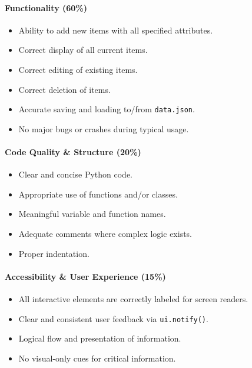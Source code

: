 \documentclass[
  justified,
  openright,
]{tufte-book}
\let\subsection\paragraph
\let\paragraph\paragraph
\let\subsection\paragraph
\let\paragraph\paragraph
\providecommand{\tightlist}{%
  \setlength{\itemsep}{0pt}\setlength{\parskip}{0pt}}
\begin{document}
\subsection{Functionality (60\%)}\label{functionality-60}

\begin{itemize}
\tightlist
\item[$\square$]
  Ability to add new items with all specified attributes.
\item[$\square$]
  Correct display of all current items.
\item[$\square$]
  Correct editing of existing items.
\item[$\square$]
  Correct deletion of items.
\item[$\square$]
  Accurate saving and loading to/from \texttt{data.json}.
\item[$\square$]
  No major bugs or crashes during typical usage.
\end{itemize}

\subsection{Code Quality \& Structure
(20\%)}\label{code-quality-structure-20}

\begin{itemize}
\tightlist
\item[$\square$]
  Clear and concise Python code.
\item[$\square$]
  Appropriate use of functions and/or classes.
\item[$\square$]
  Meaningful variable and function names.
\item[$\square$]
  Adequate comments where complex logic exists.
\item[$\square$]
  Proper indentation.
\end{itemize}

\subsection{Accessibility \& User Experience
(15\%)}\label{accessibility-user-experience-15}

\begin{itemize}
\tightlist
\item[$\square$]
  All interactive elements are correctly labeled for screen readers.
\item[$\square$]
  Clear and consistent user feedback via \texttt{ui.notify()}.
\item[$\square$]
  Logical flow and presentation of information.
\item[$\square$]
  No visual-only cues for critical information.
\end{itemize}
\end{document}
